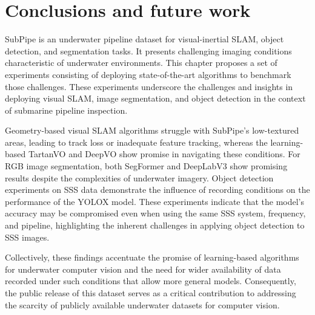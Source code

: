 \section{Conclusions and future work}
\label{sec:conclusion}

SubPipe is an underwater pipeline dataset for visual-inertial SLAM, object detection, and segmentation tasks. 
It presents challenging imaging conditions characteristic of underwater environments. 
This chapter proposes a set of experiments consisting of deploying state-of-the-art algorithms to benchmark those challenges. These experiments underscore the challenges and insights in deploying visual SLAM, image segmentation, and object detection in the context of submarine pipeline inspection. 

Geometry-based visual SLAM algorithms struggle with SubPipe's low-textured areas, leading to track loss or inadequate feature tracking, whereas the learning-based TartanVO and DeepVO show promise in navigating these conditions. For RGB image segmentation, both SegFormer and DeepLabV3 show promising results despite the complexities of underwater imagery. 
Object detection experiments on SSS data demonstrate the influence of recording conditions on the performance of the YOLOX model. These experiments indicate that the model's accuracy may be compromised even when using the same SSS system, frequency, and pipeline, highlighting the inherent challenges in applying object detection to SSS images.

Collectively, these findings accentuate the promise of learning-based algorithms for underwater computer vision and the need for wider availability of data recorded under such conditions that allow more general models.
Consequently, the public release of this dataset serves as a critical contribution to addressing the scarcity of publicly available underwater datasets for computer vision. 


